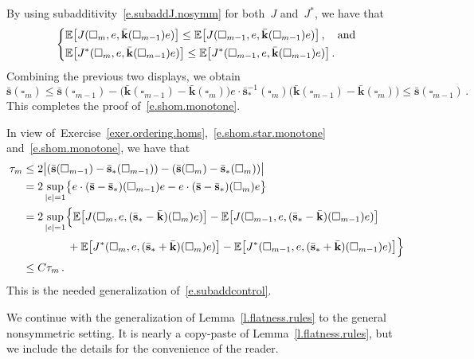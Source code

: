 \documentclass[11pt,twoside]{article} %
\let\oldsquare\square %
\renewcommand{\square}{\oldsquare}
\numberwithin{equation}{section}
\theoremstyle{definition}
\let\originalleft\left
\let\originalright\right
\renewcommand{\left}{\mathopen{}\mathclose\bgroup\originalleft}
\renewcommand{\right}{\aftergroup\egroup\originalright}
\newcommand{\shom}{\bar{\mathbf{s}}}
\newcommand{\khom}{\bar{\mathbf{k}}}
\newcommand{\cu}{\square}
\newcommand{\E}{\mathbb{E}}
\begin{document}
By using subadditivity~\eqref{e.subaddJ.nosymm} for both~$J$ and~$J^*$, we have that 
\begin{equation*}
\left\{
\begin{aligned}
& \E \bigl[ J(\cu_m,e,\khom(\cu_{m-1})e) \bigr] \leq 
\E \bigl[ J(\cu_{m-1},e,\khom(\cu_{m-1})e) \bigr]
\,, \quad \mbox{and}  \\ & 
\E \bigl[ J^*(\cu_m,e,\khom(\cu_{m-1})e) \bigr ]
\leq 
\E \bigl[ J^*(\cu_{m-1},e,\khom(\cu_{m-1})e) \bigr ]
\,.
\end{aligned}
\right.
\end{equation*}
Combining the previous two displays, we obtain
\begin{equation*}
\shom(\cu_m) 
\leq 
\shom(\cu_{m-1}) 
-
\bigl ( \khom(\cu_{m-1}) -\khom(\cu_m) \bigr )e  \cdot \shom_*^{-1}(\cu_m)\bigl ( \khom(\cu_{m-1}) -\khom(\cu_m) \bigr )
\leq \shom(\cu_{m-1})\,.
\end{equation*}
This completes the proof of~\eqref{e.shom.monotone}.

\smallskip

In view of~Exercise~\ref{exer.ordering.homs},~\eqref{e.shom.star.monotone} and~\eqref{e.shom.monotone}, we have that 
\begin{align}
\label{e.subaddcontrol.nosymm}
\tau_m 
&
\leq 
2
\bigl|
(\shom (\cu_{m-1}) - \shom_*(\cu_{m-1}))
-
(\shom (\cu_{m}) - \shom_*(\cu_m))
\bigr|
\notag \\& 
=
2\sup_{|e|=1} 
\bigl\{ e \cdot 
(\shom - \shom_*)(\cu_{m-1})
e 
-
e\cdot 
(\shom - \shom_*)(\cu_m)
e 
\bigr\}
\notag \\& 
=
2\sup_{|e|=1} 
\Bigl\{
\E \bigl[ J(\cu_m,e,(\shom_*- \khom )(\cu_m) e) \bigr]  
-
\E \bigl[ J(\cu_{m-1},e,(\shom_*- \khom )(\cu_{m-1}) e) \bigr] 
\notag \\ & \qquad \qquad 
+ \E\bigl[ J^*(\cu_m,e,(\shom_*+\khom)(\cu_m) e) \bigr]
-
\E\bigl[ J^*(\cu_{m-1},e,(\shom_*+\khom)(\cu_{m-1}) e) \bigr]
\Bigr\}
\notag \\ & 
\leq C \tau_m
\,.
\end{align}
This is the needed generalization of~\eqref{e.subaddcontrol}. 

\smallskip

We continue with the generalization of Lemma~\ref{l.flatness.rules} to the general nonsymmetric setting. It is nearly a copy-paste of Lemma~\ref{l.flatness.rules}, but we include the details for the convenience of the reader. 
\end{document}
